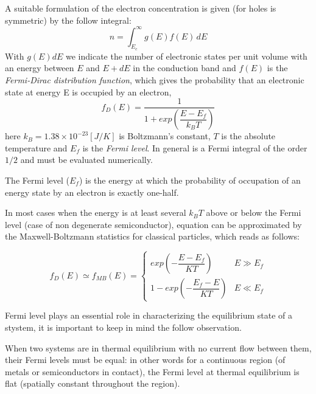 A suitable formulation of the electron concentration is given (for holes is symmetric) by the follow integral:
\begin{equation}
\label{eq: carrier densiy integral}
n = \int_{E_c}^\infty g(E)f(E) \, dE
\end{equation}
With $g(E)dE$ we indicate the number of electronic states per unit volume with an energy between $E$ and $E+dE$ in the conduction band and $f(E)$ is the \textit{Fermi-Dirac distribution function}, which gives the probability that an electronic state at energy E is occupied by an electron,
\begin{equation}
\label{eq: fermi dirac distribution}
f_D(E) = \dfrac{1}{1+exp\left(\dfrac{E-E_f}{k_BT}\right)} 
\end{equation}
here $k_B=1.38\times10^{-23}[J/K]$ is Boltzmann's constant, $T$ is the absolute temperature and $E_f$ is the \textit{Fermi level}. In general  is a Fermi integral of the order $1/2$ and must be evaluated numerically.
 
\begin{Definizione}
The Fermi level ($E_f$) is the energy at which the probability of occupation of an energy state by an electron is exactly one-half.
\end{Definizione}

In most cases when the energy is at least several $k_BT$ above or below the Fermi level (case of non degenerate semiconductor), equation  can be approximated by the Maxwell-Boltzmann statistics for classical particles, which reads as follows:

\begin{equation}
\label{eq: maxwell distribution}
f_D(E)\simeq f_{MB}(E) = 
\begin{cases}
exp\left(-\dfrac{E-E_f}{KT}\right) & E\gg E_f \\
1-exp\left(-\dfrac{E_f-E}{KT}\right) & E \ll E_f
\end{cases}
\end{equation}

Fermi level plays an essential role in characterizing the equilibrium state of a stystem, it is important to keep in mind the follow observation.

\begin{Osservazione}
When two systems are in thermal equilibrium with no current flow between them, their Fermi levels must be equal: in other words for a continuous region (of metals or semiconductors in contact), the Fermi level at thermal equilibrium is flat (spatially constant throughout the region).
\end{Osservazione}

